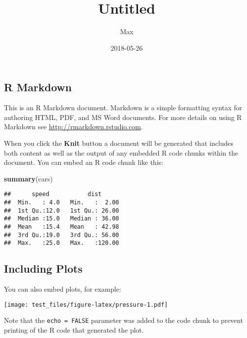 \documentclass[]{article}
\title{Untitled}
\author{Max}
\date{2018-05-26}
\newenvironment{Shaded}{\begin{snugshade}}{\end{snugshade}}
\newcommand{\KeywordTok}[1]{\textcolor[rgb]{0.13,0.29,0.53}{\textbf{#1}}}
\newcommand{\NormalTok}[1]{#1}
\begin{document}
\maketitle

\subsection{R Markdown}\label{r-markdown}

This is an R Markdown document. Markdown is a simple formatting syntax
for authoring HTML, PDF, and MS Word documents. For more details on
using R Markdown see \url{http://rmarkdown.rstudio.com}.

When you click the \textbf{Knit} button a document will be generated
that includes both content as well as the output of any embedded R code
chunks within the document. You can embed an R code chunk like this:

\begin{Shaded}
\begin{Highlighting}[]
\KeywordTok{summary}\NormalTok{(cars)}
\end{Highlighting}
\end{Shaded}

\begin{verbatim}
##      speed           dist       
##  Min.   : 4.0   Min.   :  2.00  
##  1st Qu.:12.0   1st Qu.: 26.00  
##  Median :15.0   Median : 36.00  
##  Mean   :15.4   Mean   : 42.98  
##  3rd Qu.:19.0   3rd Qu.: 56.00  
##  Max.   :25.0   Max.   :120.00
\end{verbatim}

\subsection{Including Plots}\label{including-plots}

You can also embed plots, for example:

\texttt{[image: test\_files/figure-latex/pressure-1.pdf]}

Note that the \texttt{echo\ =\ FALSE} parameter was added to the code
chunk to prevent printing of the R code that generated the plot.
\end{document}
